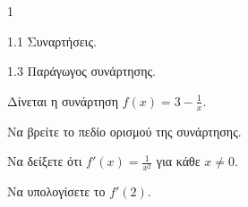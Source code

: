\begin{ylh}{1}
    \item 1.1 Συναρτήσεις.
    \item 1.3 Παράγωγος συνάρτησης.
\end{ylh}
Δίνεται η συνάρτηση $f(x) = 3 - \frac{1}{x}$.
\begin{alist}
    \item Να βρείτε το πεδίο ορισμού της συνάρτησης. 
    \item Να δείξετε ότι $f'(x) = \frac{1}{x^2}$ για κάθε $x \neq 0$. 
    \item Να υπολογίσετε το $f'(2)$. 
\end{alist}

